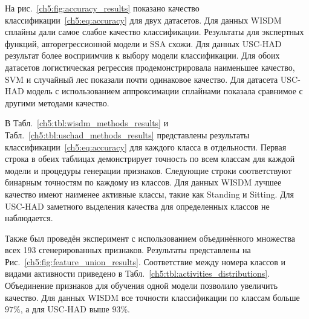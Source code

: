 На рис.~\ref{ch5:fig:accuracy_results} показано качество классификации~\eqref{ch5:eq:accuracy} для двух датасетов.
Для данных WISDM сплайны дали самое слабое качество классификации.
Результаты для экспертных функций, авторегрессионной модели и SSA схожи.
Для данных USC-HAD результат более восприимчив к выбору модели классификации. 
Для обоих датасетов логистическая регрессия продемонстрировала наименьшее качество, SVM и случайный лес показали почти одинаковое качество.
Для датасета USC-HAD модель с использованием аппроксимации сплайнами
показала сравнимое с другими методами качество. 

В Табл.~\ref{ch5:tbl:wisdm_methods_results} и Табл.~\ref{ch5:tbl:uschad_methods_results} представлены результаты классификации~\eqref{ch5:eq:accuracy} для каждого класса в отдельности.
Первая строка в обеих таблицах демонстрирует точность по всем классам для каждой модели и процедуры генерации признаков.
Следующие строки соответствуют бинарным точностям по каждому из классов.
Для данных WISDM лучшее качество имеют наименее активные классы, такие как Standing и Sitting. 
Для USC-HAD заметного выделения качества для определенных классов не наблюдается.

Также был проведён эксперимент с использованием объединённого множества всех 193 сгенерированных признаков.
Результаты представлены на Рис.~\ref{ch5:fig:feature_union_results}. Соответствие между номера классов и видами активности приведено в Табл.~\ref{ch5:tbl:activities_distributions}. 
Объединение признаков для обучения одной модели позволило увеличить качество. 
Для данных WISDM все точности классификации по классам больше $97 \%$, а для USC-HAD выше $93 \%$.
